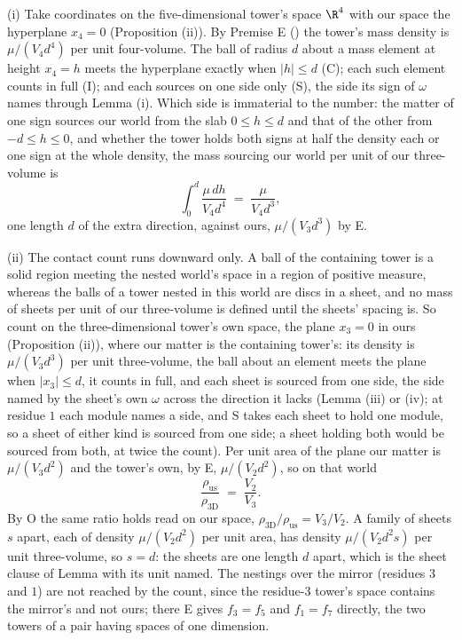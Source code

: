 (i) Take coordinates on the five-dimensional tower's space $\R^{4}$ with our space the hyperplane $x_{4} = 0$ (Proposition (ii)). By Premise E () the tower's mass density is $\mu/(V_{4}d^{4})$ per unit four-volume. The ball of radius $d$ about a mass element at height $x_{4} = h$ meets the hyperplane exactly when $|h| \leq d$ (C); each such element counts in full (I); and each sources on one side only (S), the side its sign of $\omega$ names through Lemma (i). Which side is immaterial to the number: the matter of one sign sources our world from the slab $0 \leq h \leq d$ and that of the other from $-d \leq h \leq 0$, and whether the tower holds both signs at half the density each or one sign at the whole density, the mass sourcing our world per unit of our three-volume is
\[
\int_{0}^{d}\frac{\mu\,dh}{V_{4}d^{4}} \;=\; \frac{\mu}{V_{4}d^{3}},
\]
one length $d$ of the extra direction, against ours, $\mu/(V_{3}d^{3})$ by E.

(ii) The contact count runs downward only. A ball of the containing tower is a solid region meeting the nested world's space in a region of positive measure, whereas the balls of a tower nested in this world are discs in a sheet, and no mass of sheets per unit of our three-volume is defined until the sheets' spacing is. So count on the three-dimensional tower's own space, the plane $x_{3} = 0$ in ours (Proposition (ii)), where our matter is the containing tower's: its density is $\mu/(V_{3}d^{3})$ per unit three-volume, the ball about an element meets the plane when $|x_{3}| \leq d$, it counts in full, and each sheet is sourced from one side, the side named by the sheet's own $\omega$ across the direction it lacks (Lemma (iii) or (iv); at residue $1$ each module names a side, and S takes each sheet to hold one module, so a sheet of either kind is sourced from one side; a sheet holding both would be sourced from both, at twice the count). Per unit area of the plane our matter is $\mu/(V_{3}d^{2})$ and the tower's own, by E, $\mu/(V_{2}d^{2})$, so on that world
\[
\frac{\rho_{\mathrm{us}}}{\rho_{3\mathrm{D}}} \;=\; \frac{V_{2}}{V_{3}} .
\]
By O the same ratio holds read on our space, $\rho_{3\mathrm{D}}/\rho_{\mathrm{us}} = V_{3}/V_{2}$. A family of sheets $s$ apart, each of density $\mu/(V_{2}d^{2})$ per unit area, has density $\mu/(V_{2}d^{2}s)$ per unit three-volume, so $s = d$: the sheets are one length $d$ apart, which is the sheet clause of Lemma  with its unit named. The nestings over the mirror (residues $3$ and $1$) are not reached by the count, since the residue-$3$ tower's space contains the mirror's and not ours; there E gives $f_{3} = f_{5}$ and $f_{1} = f_{7}$ directly, the two towers of a pair having spaces of one dimension.

